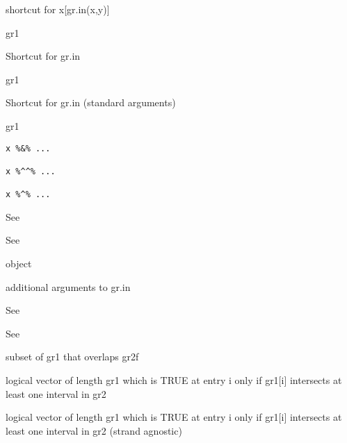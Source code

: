 \documentclass[a4paper]{book}
\begin{document}
%
\begin{Description}\relax
shortcut for x[gr.in(x,y)]

gr1 

Shortcut for gr.in

gr1 

Shortcut for gr.in (standard arguments)

gr1 
\end{Description}
%
\begin{Usage}
\begin{verbatim}
x %&% ...

x %^^% ...

x %^% ...
\end{verbatim}
\end{Usage}
%
\begin{Arguments}
\begin{ldescription}
\item[\code{x}] See 

\item[\code{...}] See 

\item[\code{x}]  object

\item[\code{...}] additional arguments to gr.in

\item[\code{x}] See 

\item[\code{...}] See 
\end{ldescription}
\end{Arguments}
%
\begin{Value}
subset of gr1 that overlaps gr2f

logical vector of length gr1 which is TRUE at entry i only if gr1[i] intersects at least one interval in gr2

logical vector of length gr1 which is TRUE at entry i only if gr1[i] intersects at least one interval in gr2 (strand agnostic)
\end{Value}
\end{document}
